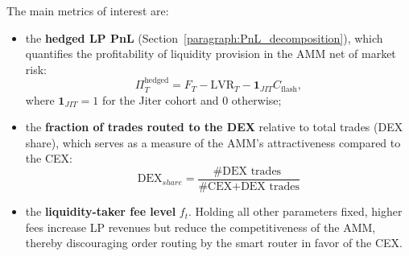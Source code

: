 \documentclass[11pt]{article}
\begin{document}
The main metrics of interest are:
\begin{itemize}
    \item the \textbf{hedged LP PnL} (Section~\ref{paragraph:PnL_decomposition}), which quantifies the profitability of 
    liquidity provision in the AMM net of market risk:
    \begin{equation}
        \Pi_T^{\mathrm{hedged}} = F_T - \mathrm{LVR}_T - \mathbf{1}_{JIT}C_{\mathrm{flash}},
    \end{equation}
    where $\mathbf{1}_{JIT}=1$ for the Jiter cohort and $0$ otherwise;
    \item the \textbf{fraction of trades routed to the DEX} relative to total trades (DEX share), which serves as a 
    measure of the AMM’s attractiveness compared to the CEX:
    \begin{equation}
        \text{DEX}_{share} = \frac{\text{\#DEX trades }}{\text{\# CEX+DEX trades}}
    \end{equation}
    \item the \textbf{liquidity-taker fee level} $f_t$. Holding all other parameters fixed, higher fees increase LP 
    revenues but reduce the competitiveness of the AMM, thereby discouraging order routing by the smart router in favor 
    of the CEX.
\end{itemize}
\end{document}
